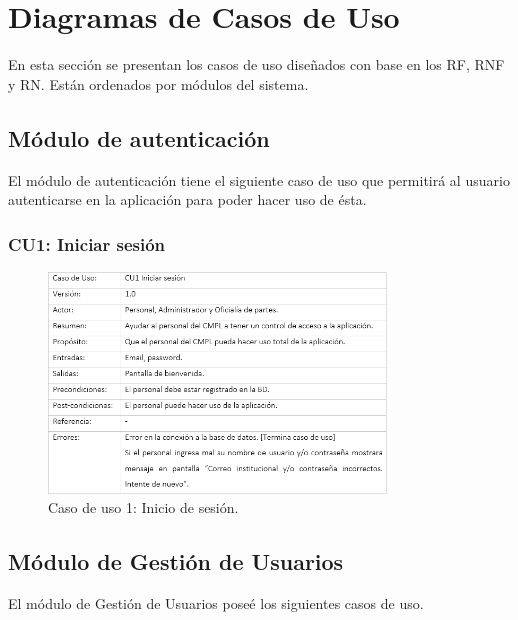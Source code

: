 \section{Diagramas de Casos de Uso}
	En esta sección se presentan los casos de uso diseñados con base en los RF, RNF y RN. Están ordenados por módulos del sistema.
	\subsection{Módulo de autenticación}
	El módulo de autenticación tiene el siguiente caso de uso que permitirá al usuario autenticarse en la aplicación para poder hacer uso de ésta.
		\subsubsection{CU1: Iniciar sesión}
			\begin{figure}[htbp!]
				\centering
					\includegraphics[width=0.8\textwidth]{images/CU/CU1}
					\caption{Caso de uso 1: Inicio de sesión.}
				\label{Tabla}
			\end{figure}
	\subsection{Módulo de Gestión de Usuarios}
	El módulo de Gestión de Usuarios poseé los siguientes casos de uso.
	
